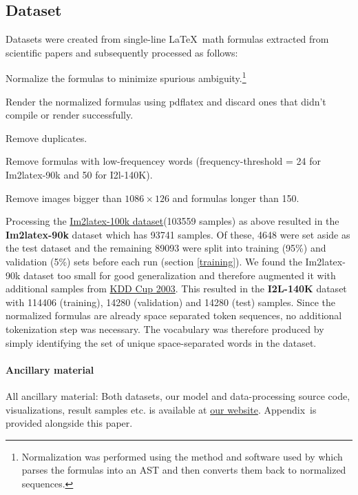 \documentclass{article}
\newcommand{\website}{https://untrix.github.io/i2l/}
\newcommand{\Suppmat}{Appendix}
\begin{document}
\subsection{Dataset}
\label{dataset}
Datasets were created from single-line \LaTeX ~math formulas extracted from scientific papers and subsequently processed as follows:
\begin{enumerate*}[label=\arabic*)]
	\item Normalize the formulas to minimize spurious ambiguity.\footnote{Normalization was performed using the method and software used by \cite{Deng2017ImagetoMarkupGW} which parses the formulas into an AST and then converts them back to normalized sequences.}
	\item Render the normalized formulas using pdflatex and discard ones that didn't compile or render successfully.
	\item Remove duplicates.
	\item Remove formulas with low-frequencey words (frequency-threshold = 24 for Im2latex-90k and 50 for I2l-140K).
	\item Remove images bigger than $1086 \times 126$ and formulas longer than 150.
\end{enumerate*}
Processing the \href{https://zenodo.org/record/56198\#.WnzcT3UbMQ9}{Im2latex-100k dataset}\footnotemark[104] (103559 samples) as above resulted in the \textbf{Im2latex-90k} dataset which has 93741 samples. Of these, 4648 were set aside as the test dataset and the remaining 89093 were split into training (95\%) and validation (5\%) sets before each run (section \ref{training}).
We found the {Im2latex-90k} dataset too small for good generalization and therefore augmented it with additional samples from \href{http://www.cs.cornell.edu/projects/kddcup/datasets.html}{KDD Cup 2003}. This resulted in the \textbf{I2L-140K} dataset with 114406 (training), 14280 (validation) and 14280 (test) samples. Since the normalized formulas are already space separated token sequences, no additional tokenization step was necessary. The vocabulary was therefore produced by simply identifying the set of unique space-separated words in the dataset.
\paragraph{Ancillary material}
All ancillary material: Both datasets, our model and data-processing source code, visualizations, result samples etc. is available at \href{\website}{our website}. \Suppmat ~is provided alongside this paper.
\end{document}
